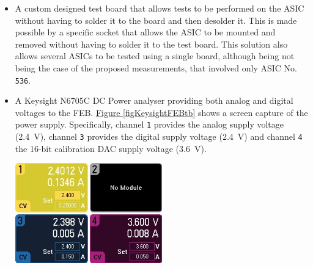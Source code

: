 \begin{itemize}
    \itemsep0em 
    \item A custom designed test board that allows tests to be performed on the ASIC without having to solder it to the board and then desolder it. This is made possible by a specific socket that allows the ASIC to be mounted and removed without having to solder it to the test board. This solution also allows several ASICs to be tested using a single board, although being not being the case of the proposed measurements, that involved only ASIC No. \texttt{536}.
    \item A Keysight N6705C DC Power analyser providing both analog and digital voltages to the FEB. \hyperref[figKeysightFEBtb]{Figure \ref{figKeysightFEBtb}} shows a screen capture of the power supply. Specifically, channel \texttt{1} provides the analog supply voltage (\SI{2.4}{\volt}), channel \texttt{3} provides the digital supply voltage (\SI{2.4}{\volt}) and channel \texttt{4} the 16-bit calibration DAC supply voltage (\SI{3.6}{\volt}).
    
    \begin{minipage}{\linewidth}
    \vspace{0.4cm}
        \centering
        \includegraphics[width=0.5\textwidth]{Images/chap1/power_supply_screen_TB.jpg}
        \label{figKeysightFEBtb}
        \vspace{0.4cm}
    \end{minipage}
    

\end{itemize}
